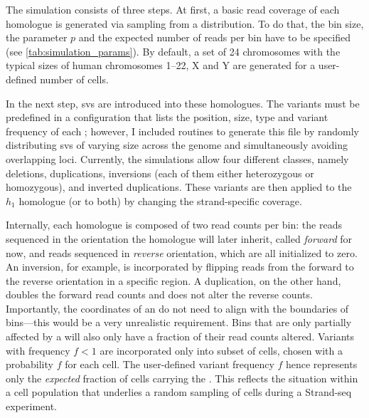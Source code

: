 The simulation consists of three steps. At first, a basic read coverage of each homologue is
generated via sampling from a \nb distribution. To do that, the bin size, the \nb
parameter $p$ and the expected number of reads per bin have to be specified
(see \cref{tab:simulation_params}). By default, a set of 24 chromosomes with the
typical sizes of human chromosomes 1--22, X and Y are generated for a user-defined number of cells.

In the next step, \acp{sv} are introduced into these homologues. The variants
must be predefined in a configuration that lists the position, size, \sv type
and variant frequency of each \sv; however, I included routines to generate this
file by randomly distributing \acp{sv} of varying size across the genome and
simultaneously avoiding overlapping loci. Currently, the simulations allow four
different \sv classes, namely deletions, duplications, inversions (each of them
either heterozygous or homozygous), and inverted duplications. These variants
are then applied to the $h_1$ homologue (or to both) by changing the
strand-specific coverage.

Internally, each homologue is composed of two read
counts per bin: the reads sequenced in the orientation the
homologue will later inherit, called \emph{forward} for now, and reads sequenced
in \emph{reverse} orientation, which are all initialized to zero. An inversion,
for example, is incorporated by flipping reads from the forward to the reverse
orientation in a specific region. A duplication, on the other hand, doubles the
forward read counts and does not alter the reverse counts. Importantly, the
coordinates of an \sv do not need to align with the boundaries of bins---this
would be a very unrealistic requirement. Bins that are only partially affected
by a \sv will also only have a fraction of their read counts altered.
Variants with frequency $f<1$ are incorporated only into subset
of cells, chosen with a probability $f$ for each cell. The user-defined
variant frequency $f$ hence represents only the \emph{expected} fraction of cells
carrying the \sv. This reflects the situation within a cell population that
underlies a random sampling of cells during a Strand-seq experiment.

